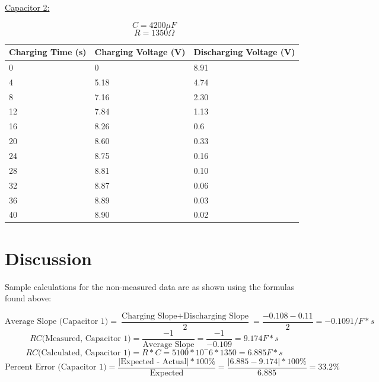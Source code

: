 \documentclass[11pt, titlepage]{article}
\begin{document}
\underline{Capacitor 2:}
\begin{center}
$$C = 4200 \mu F$$
$$R = 1350 \Omega$$
\begin{tabular}
{|m{9em}|m{9em}|m{9em}|}
\hline
Charging Time (s) & Charging Voltage (V) & Discharging Voltage (V) \\
\hline
0 & 0 & 8.91\\
\hline
4 & 5.18 & 4.74\\
\hline
8 & 7.16 & 2.30\\
\hline
12 & 7.84 & 1.13\\
\hline
16 & 8.26 & 0.6\\
\hline
20 & 8.60 & 0.33\\
\hline
24 & 8.75 & 0.16\\
\hline
28 & 8.81 & 0.10\\
\hline
32 & 8.87 & 0.06\\
\hline
36 & 8.89 & 0.03\\
\hline
40 & 8.90 & 0.02\\
\hline
\end{tabular}
\end{center}

\section*{Discussion}
Sample calculations for the non-measured data are as shown using the formulas found above:

$$\text{Average Slope (Capacitor 1)} = \frac{\text{Charging Slope} + \text{Discharging Slope}}{2} = \frac{-0.108 - 0.11}{2} = -0.109 1/F*s$$
$$RC \text{(Measured, Capacitor 1)} = \frac{-1}{\text{Average Slope}} = \frac{-1}{-0.109} = 9.174 F*s$$
$$RC \text{(Calculated, Capacitor 1)} = R*C = 5100*10^-6*1350 = 6.885 F*s$$
$$\text{Percent Error (Capacitor 1)} = \frac{\text{$|$Expected - Actual$|$} * 100\%}{\text{Expected}} = \frac{|6.885 - 9.174| * 100\%}{6.885} = 33.2\%$$
\end{document}
